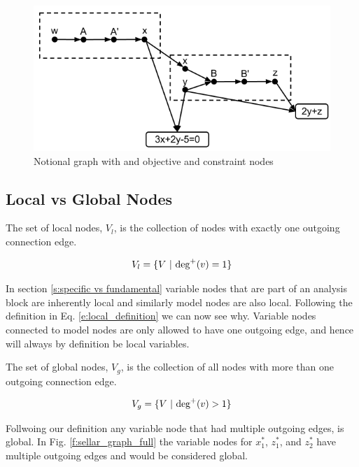 \begin{figure}[htb!]
  \begin{center}
    \includegraphics[width=.6\textwidth]{images/obj_const_graph}
  \end{center}
  \caption{Notional graph with and objective and constraint nodes \label{f:obj-cons}}
\end{figure}

\subsection{Local vs Global Nodes}

  The set of local nodes, $V_l$, is the collection of 
  nodes with exactly one outgoing connection edge. 

  \begin{equation}
    V_{l} = \{V \ | \  \textrm{deg}^+(v)=1\}
    \label{e:local_definition}
  \end{equation}

  In section \ref{s:specific vs fundamental} variable nodes that are part of 
  an analysis block are inherently local and similarly model nodes 
  are also local. Following the definition in Eq. \ref{e:local_definition}
  we can now see why. Variable nodes connected to model nodes are only allowed to 
  have one outgoing edge, and hence will always by definition be local variables. 

  The set of global nodes, $V_g$, is the collection of all nodes with more than 
  one outgoing connection edge. 

  \begin{equation}
    V_{g} = \{V \ | \  \textrm{deg}^+(v)>1\}
    \label{e:global_definition}
  \end{equation}

  Follwoing our definition any variable node that had multiple 
  outgoing edges, is global. In Fig. \ref{f:sellar_graph_full} 
  the variable nodes for $x_1^*$, $z_1^*$, and $z_2^*$ have multiple outgoing 
  edges and would be considered global. 

